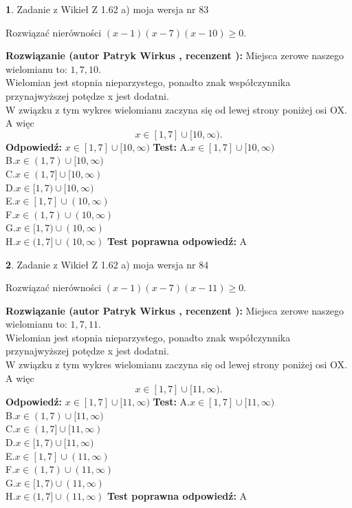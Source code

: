 \documentclass[12pt, a4paper]{article}
\theoremstyle{definition} %
\newtheorem{zad}{}
\newcommand{\zadStart}[1]{\begin{zad}#1\newline}
\newcommand{\zadStop}{\end{zad}}
\newcommand{\rozwStart}[2]{\noindent \textbf{Rozwiązanie (autor #1 , recenzent #2): }\newline}
\newcommand{\rozwStop}{\newline}
\newcommand{\odpStart}{\noindent \textbf{Odpowiedź:}\newline}
\newcommand{\odpStop}{\newline}
\newcommand{\testStart}{\noindent \textbf{Test:}\newline}
\newcommand{\testStop}{\newline}
\newcommand{\kluczStart}{\noindent \textbf{Test poprawna odpowiedź:}\newline}
\newcommand{\kluczStop}{\newline}
\begin{document}
\zadStart{Zadanie z Wikieł Z 1.62 a) moja wersja nr 83}

Rozwiązać nierówności $(x-1)(x-7)(x-10)\ge0$.
\zadStop
\rozwStart{Patryk Wirkus}{}
Miejsca zerowe naszego wielomianu to: $1, 7, 10$.\\
Wielomian jest stopnia nieparzystego, ponadto znak współczynnika przy\linebreak najwyższej potędze x jest dodatni.\\ W związku z tym wykres wielomianu zaczyna się od lewej strony poniżej osi OX. A więc $$x \in [1,7] \cup [10,\infty).$$
\rozwStop
\odpStart
$x \in [1,7] \cup [10,\infty)$
\odpStop
\testStart
A.$x \in [1,7] \cup [10,\infty)$\\
B.$x \in (1,7) \cup [10,\infty)$\\
C.$x \in (1,7] \cup [10,\infty)$\\
D.$x \in [1,7) \cup [10,\infty)$\\
E.$x \in [1,7] \cup (10,\infty)$\\
F.$x \in (1,7) \cup (10,\infty)$\\
G.$x \in [1,7) \cup (10,\infty)$\\
H.$x \in (1,7] \cup (10,\infty)$
\testStop
\kluczStart
A
\kluczStop



\zadStart{Zadanie z Wikieł Z 1.62 a) moja wersja nr 84}

Rozwiązać nierówności $(x-1)(x-7)(x-11)\ge0$.
\zadStop
\rozwStart{Patryk Wirkus}{}
Miejsca zerowe naszego wielomianu to: $1, 7, 11$.\\
Wielomian jest stopnia nieparzystego, ponadto znak współczynnika przy\linebreak najwyższej potędze x jest dodatni.\\ W związku z tym wykres wielomianu zaczyna się od lewej strony poniżej osi OX. A więc $$x \in [1,7] \cup [11,\infty).$$
\rozwStop
\odpStart
$x \in [1,7] \cup [11,\infty)$
\odpStop
\testStart
A.$x \in [1,7] \cup [11,\infty)$\\
B.$x \in (1,7) \cup [11,\infty)$\\
C.$x \in (1,7] \cup [11,\infty)$\\
D.$x \in [1,7) \cup [11,\infty)$\\
E.$x \in [1,7] \cup (11,\infty)$\\
F.$x \in (1,7) \cup (11,\infty)$\\
G.$x \in [1,7) \cup (11,\infty)$\\
H.$x \in (1,7] \cup (11,\infty)$
\testStop
\kluczStart
A
\kluczStop
\end{document}
